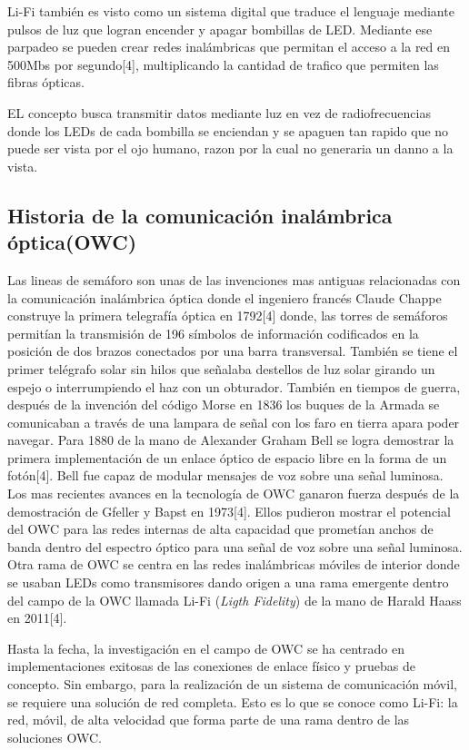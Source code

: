\documentclass[10pt,journal,compsoc]{IEEEtran}
\begin{document}
Li-Fi también es visto como un sistema digital que traduce el lenguaje mediante pulsos de luz que logran encender y apagar bombillas de LED. Mediante ese parpadeo se pueden crear redes inalámbricas que permitan el acceso a la red en 500Mbs por segundo[4], multiplicando la cantidad de trafico que permiten las fibras ópticas. 

EL concepto busca transmitir datos mediante luz en vez de radiofrecuencias donde los LEDs de cada bombilla se enciendan y se apaguen tan rapido que no puede ser vista por el ojo humano, razon por la cual no generaria un danno a la vista.

\subsection{Historia de la comunicación inalámbrica óptica(OWC)}

Las lineas de semáforo son unas de las invenciones mas antiguas relacionadas con la comunicación inalámbrica óptica donde el ingeniero francés Claude Chappe construye la primera telegrafía óptica en 1792[4] donde, las torres de semáforos permitían la transmisión de 196 símbolos de información codificados en la posición de dos brazos conectados por una barra transversal. También se tiene el primer telégrafo solar sin hilos que señalaba destellos de luz solar girando un espejo o interrumpiendo el haz con un obturador. También en tiempos de guerra, después de la invención del código Morse en 1836 los buques de la Armada se comunicaban a través de una lampara de señal con los faro en tierra apara poder navegar. Para 1880 de la mano de Alexander Graham Bell se logra demostrar la primera implementación de un enlace óptico de espacio libre en la forma de un fotón[4]. Bell fue capaz de modular mensajes de voz sobre una señal luminosa. 
Los mas recientes avances en la tecnología de OWC ganaron fuerza después de la demostración de  Gfeller y Bapst en 1973[4]. Ellos pudieron mostrar el potencial del OWC para las redes internas de alta capacidad que prometían anchos de banda dentro del espectro óptico para una señal de voz sobre una señal luminosa. 
Otra rama de OWC se centra en las redes inalámbricas móviles de interior donde se usaban LEDs como transmisores dando origen a una rama emergente dentro del campo de la OWC llamada Li-Fi (\emph{Ligth Fidelity}) de la mano de Harald Haass en 2011[4].

Hasta la fecha, la investigación en el campo de OWC se ha centrado en implementaciones exitosas de las conexiones de enlace físico y pruebas de concepto. Sin embargo, para la realización de un sistema de comunicación móvil, se requiere una solución de red completa. Esto es lo que se conoce como Li-Fi: la red, móvil, de alta velocidad que forma parte de una rama dentro de las  soluciones OWC.
\end{document}
